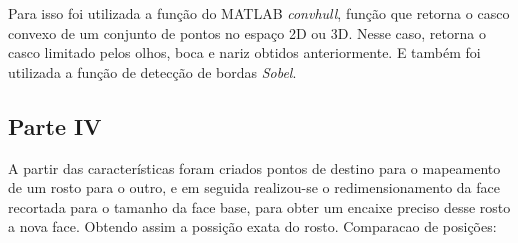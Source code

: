 \documentclass[journal]{IEEEtran}
\begin{document}
Para isso foi utilizada a função do MATLAB \textit{convhull}, função que retorna o casco convexo de um conjunto de pontos no espaço 2D ou 3D. Nesse caso, retorna o casco limitado pelos olhos, boca e nariz obtidos anteriormente. E também foi utilizada a função de detecção de bordas \textit{Sobel}.
\begin{figure}[h]
\centering
{}
\end{figure}

\subsection{Parte IV}

A partir das características foram criados pontos de destino para o mapeamento de um rosto para o outro, e em seguida realizou-se o redimensionamento da face recortada para o tamanho da face base, para obter um encaixe preciso desse rosto a nova face. Obtendo assim a possição exata do rosto.
Comparacao de posições:
\end{document}
